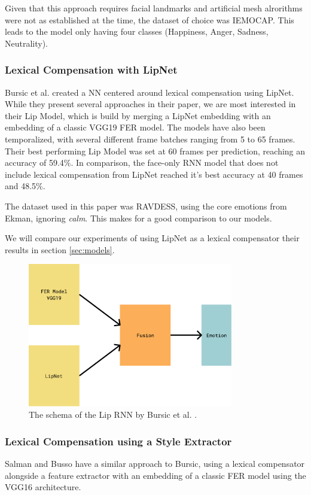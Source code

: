 Given that this approach requires facial landmarks and artificial mesh alrorithms were not as established at the time, the dataset of choice was IEMOCAP. This leads to the model only having four classes (Happiness, Anger, Sadness, Neutrality).

\subsubsection{Lexical Compensation with LipNet}
Bursic et al. \cite{bursic2020improving} created a NN centered around lexical compensation using LipNet. While they present several approaches in their paper, we are most interested in their Lip Model, which is build by merging a LipNet embedding with an embedding of a classic VGG19 FER model. The models have also been temporalized, with several different frame batches ranging from 5 to 65 frames. Their best performing Lip Model was set at 60 frames per prediction, reaching an accuracy of 59.4\%. In comparison, the face-only RNN model that does not include lexical compensation from LipNet reached it's best accuracy at 40 frames and 48.5\%.

The dataset used in this paper was RAVDESS, using the core emotions from Ekman, ignoring \emph{calm}. This makes for a good comparison to our models.

We will compare our experiments of using LipNet as a lexical compensator their results in section \ref{sec:models}.

\begin{figure}
    \centering
    \includegraphics[width=0.8\textwidth]{res/bursicschema.pdf}
    \caption{The schema of the Lip RNN by Bursic et al. \cite{bursic2020improving}.}
    \label{fig:bursic_schema}
\end{figure}

\subsubsection{Lexical Compensation using a Style Extractor}
Salman and Busso \cite{salman2020style} have a similar approach to Bursic, using a lexical compensator alongside a feature extractor with an embedding of a classic FER model using the VGG16 architecture.

